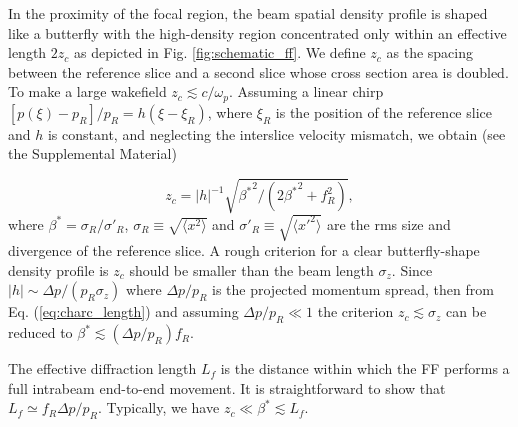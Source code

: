 \documentclass[
aps,
prl,
reprint,
superscriptaddress,
amsmath,
amssymb,
showpacs
]{revtex4-2}
\begin{document}
In the proximity of the focal region, the beam spatial density profile is shaped like a butterfly with the high-density region concentrated only within an effective length $2z_c$ as depicted in Fig. \ref{fig:schematic_ff}. We define $z_c$ as the spacing between the reference slice and a second slice whose cross section area is doubled. To make a large wakefield $z_c\lesssim c/\omega_p$. Assuming a linear chirp $[p(\xi)-p_R]/p_R=h(\xi-\xi_R)$, where $\xi_R$ is the position of the reference slice and $h$ is constant, and neglecting the interslice velocity mismatch, we obtain (see the Supplemental Material)

\begin{equation}
\label{eq:charc_length}
  z_c = |h|^{-1}\sqrt{{\beta^*}^2/(2{\beta^*}^2+f_R^2)},
\end{equation}
where $\beta^*=\sigma_R/\sigma'_R$, $\sigma_R\equiv\sqrt{\langle x^2\rangle}$ and $\sigma'_R\equiv\sqrt{\langle {x'}^2\rangle}$ are the rms size and divergence of the reference slice. A rough criterion for a clear butterfly-shape density profile is $z_c$ should be smaller than the beam length $\sigma_z$. Since $|h|\sim\Delta p/(p_R \sigma_z)$ where $\Delta p/p_R$ is the projected momentum spread, then from Eq. (\ref{eq:charc_length}) and assuming $\Delta p/p_R\ll1$ the criterion $z_c\lesssim\sigma_z$ can be reduced to $\beta^*\lesssim(\Delta p/p_R) f_R$.

The effective diffraction length $L_f$ is the distance within which the FF performs a full intrabeam end-to-end movement. It is straightforward to show that $L_f\simeq f_R \Delta p/p_R$. Typically, we have $z_c\ll\beta^*\lesssim L_f$.
\end{document}
